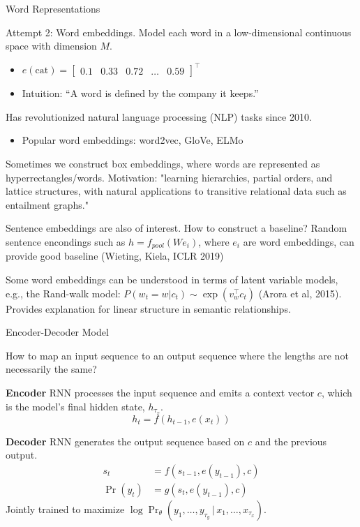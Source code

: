 \documentclass[english]{article}
\begin{document}
\item 
 {Word Representations}

Attempt 2: Word embeddings. Model each word in a low-dimensional continuous space with dimension $M$.
\begin{itemize}
\item $e(\text{cat})=\left[\begin{smallmatrix}
0.1 & 0.33 & 0.72 & \dots & 0.59
\end{smallmatrix}\right]^\top$
\item Intuition: ``A word is defined by the company it keeps.''
\end{itemize}
\vspace{5mm}
Has revolutionized natural language processing (NLP) tasks since 2010.
\begin{itemize}
\item Popular word embeddings: word2vec, GloVe, ELMo
\end{itemize}
 
Sometimes we construct box embeddings, where words are represented as hyperrectangles/words. Motivation: "learning hierarchies, partial orders, and lattice structures, with natural applications to transitive relational data such as entailment graphs." 

Sentence embeddings are also of interest. How to construct a baseline? Random sentence encondings such as $h=f_{pool}(We_i)$, where $e_i$ are word embeddings, can provide good baseline (Wieting, Kiela, ICLR 2019)


Some word embeddings can be understood in terms of latent variable models, e.g., the Rand-walk model: $P(w_t=w|c_t)\sim \exp(v_w^\top c_t)$ (Arora et al, 2015). Provides explanation for linear structure in semantic relationships. 



\item 
 {Encoder-Decoder Model}

How to map an input sequence to an output sequence where the lengths are not necessarily the same?
 
\textbf{Encoder} RNN processes the input sequence and emits a context vector $c$, which is the model's final hidden state, $h_{\tau_x}$.
$$h_t = f(h_{t-1},e(x_t))$$

\textbf{Decoder} RNN generates the output sequence based on $c$ and the previous output.
\begin{align*}
s_t &= f(s_{t-1}, e(y_{t-1}), c)\\
\Pr(y_t) &= g(s_t, e(y_{t-1}), c)
\end{align*}
Jointly trained to maximize $\log{\Pr_\theta(y_1,\dots,y_{\tau_y}\,|\,x_1,\dots,x_{\tau_x})}$.
 
\end{document}
